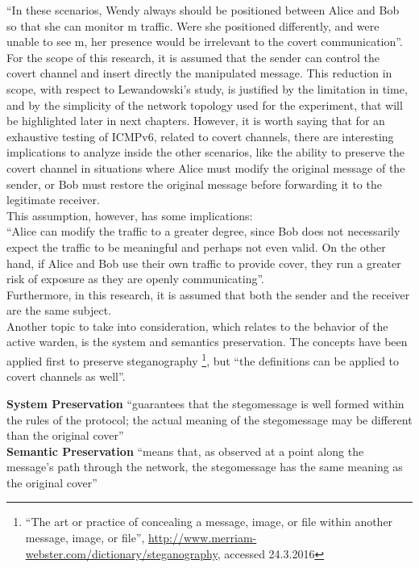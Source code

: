 \documentclass[12pt]{article}
\begin{document}
``In these scenarios, Wendy always should be positioned between Alice and Bob so that she can monitor m\textprime\hspace{2pt} traffic. Were she positioned differently, and were unable to see m\textprime, her presence would be 
irrelevant to the covert communication''.\\
For the scope of this research, it is assumed that the sender can control the covert channel and insert directly the manipulated message. This reduction in scope, with respect to Lewandowski's study, is justified by the 
limitation in time, and by the simplicity of the network topology used for the experiment, that will be highlighted later in next chapters. However, it is worth saying that for an exhaustive testing of ICMPv6, related to 
covert channels, there are interesting implications to analyze inside the other scenarios, like the ability to preserve the covert channel in situations where Alice must modify the original message of the sender, or Bob 
must restore the original message before forwarding it to the legitimate receiver.\\
This assumption, however, has some implications:\\
``Alice can modify the traffic to a greater degree, since Bob does not necessarily expect the traffic to be meaningful and perhaps not even valid. On the other hand, if Alice and Bob use their own traffic to provide 
cover, they run a greater risk of exposure as they are openly communicating''.\\
Furthermore, in this research, it is assumed that both the sender and the receiver are the same subject.\\

Another topic to take into consideration, which relates to the behavior of the active warden, is the system and semantics preservation. The concepts have been applied first to preserve steganography
\footnote{``The art or practice of concealing a message, image, or file within another message, image, or file'', \url{http://www.merriam-webster.com/dictionary/steganography}, accessed 24.3.2016}\cite{lucena2}, but 
``the definitions can be applied to covert channels as well''\cite{netaware}.

\textbf{System Preservation} ``guarantees that the stegomessage is well formed within the rules of the protocol; the actual meaning of the stegomessage may be different than the original cover''\cite{lucena2}\\
\textbf{Semantic Preservation} ``means that, as observed at a point along the message’s path through the network, the stegomessage has the same meaning as the original cover''\cite{lucena2}\\
\end{document}
